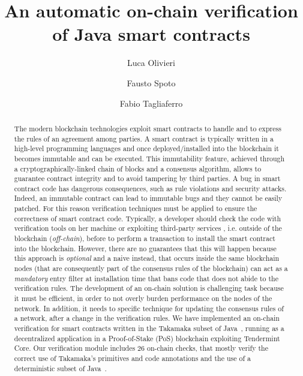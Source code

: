 \documentclass{easychair}
\title{An automatic on-chain verification of Java smart contracts}
\author{
Luca Olivieri\inst{1,2}
\and
Fausto Spoto\inst{1}
\and
Fabio Tagliaferro\inst{1}
}
\institute{
  Università degli Studi di Verona, Italy\\
  \email{\{luca.olivieri, fausto.spoto, fabio.tagliaferro\}@univr.it}
\and
   Corvallis S.r.l., Padova, Italy\\
 }
\begin{document}
\maketitle

\begin{abstract}

  The modern blockchain technologies exploit smart contracts to handle and to express the rules of an agreement among parties.
  A smart contract is typically written in a high-level programming languages and once deployed/installed into the blockchain 
  it becomes immutable and can be executed. This immutability feature, achieved through a cryptogra\-phically-linked chain of blocks and a consensus algorithm, 
  allows to guarantee contract integrity and to avoid tampering by third parties. A bug in smart contract code has dangerous consequences, such as rule violations 
  and security attacks. Indeed, an immutable contract can lead to immutable bugs and they cannot be easily patched.
  For this reason verification techniques must be applied to ensure the correctness of smart contract code. Typically, a developer should check the code with 
  verification tools on her machine or exploiting third-party services \cite{TIGR21, GriecoSCFG20, FeistGG19}, i.e. outside of the blockchain (\emph{off-chain}), before to perform a transaction to 
  install the smart contract into the blockchain. However, there are no guarantees that this will happen because this approach is \emph{optional} and a naive 
  instead, that occurs inside the same blockchain nodes (that are consequently part of the consensus rules of the blockchain) can act as a \emph{mandatory} entry filter at installation time
  that bans code that does not abide to the verification rules. The development of an on-chain solution is 
  challenging task because it must be efficient, in order to not overly burden performance on the nodes of the network. In addition, it needs to specific technique 
  for updating the consensus rules of a network, after a change in the verification rules. We have implemented an on-chain verification for smart contracts written 
  in the Takamaka subset of Java~\cite{Spoto19}, running as a decentralized application in a Proof-of-Stake (PoS) blockchain exploiting Tendermint Core. Our verification module
  includes $26$ on-chain checks, that mostly verify the correct use of Takamaka's primitives and code annotations and the use of a deterministic subset of Java~\cite{Spoto20}.

\end{abstract}
\end{document}
